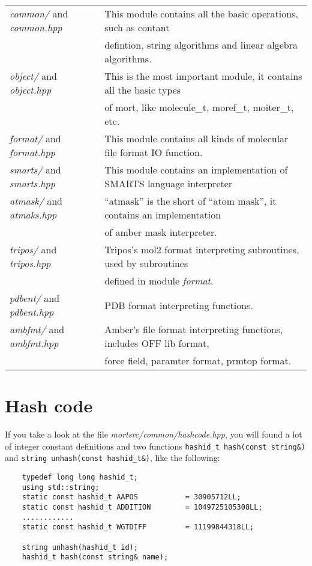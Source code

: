 \documentclass[letterpaper]{book}
\begin{document}
\begin{tabular}{ll}

{\it common/} and {\it common.hpp} & This module contains all the basic operations, such as contant \\
                             & defintion, string algorithms and linear algebra algorithms. \\
{\it object/} and {\it object.hpp} & This is the most important module, it contains all the basic types \\
                             & of mort, like molecule\_t, moref\_t, moiter\_t, etc. \\
{\it format/} and {\it format.hpp} & This module contains all kinds of molecular file format IO function. \\
{\it smarts/} and {\it smarts.hpp} & This module contains an implementation of SMARTS language interpreter \\
{\it atmask/} and {\it atmaks.hpp} & ``atmask'' is the short of ``atom mask'', it contains an implementation \\
                             & of amber mask interpreter. \\
{\it tripos/} and {\it tripos.hpp} & Tripos's mol2 format interpreting subroutines, used by subroutines \\
                             & defined in module {\it format}. \\
{\it pdbent/} and {\it pdbent.hpp} & PDB format interpreting functions. \\
{\it ambfmt/} and {\it ambfmt.hpp} & Amber's file format interpreting functions, includes OFF lib format,  \\
                             & force field, paramter format, prmtop format. 

\end{tabular}

\section{Hash code}
  
  If you take a look at the file {\it mortsrc/common/hashcode.hpp}, you will found a lot of integer constant 
definitions and two functions \lstinline$hashid_t hash(const string&)$ and 
\lstinline$string unhash(const hashid_t&)$, like the following:

\begin{lstlisting}
    typedef long long hashid_t;
    using std::string;
    static const hashid_t AAPOS           = 30905712LL;
    static const hashid_t ADDITION        = 1049725105308LL;
    ............
    static const hashid_t WGTDIFF         = 11199844318LL;

    string unhash(hashid_t id);
    hashid_t hash(const string& name);
\end{lstlisting}
\end{document}

